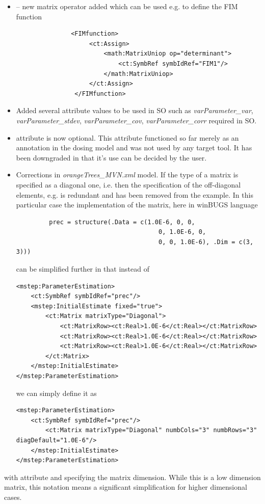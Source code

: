 \begin{itemize}
\item
{} -- new matrix operator added which can be used e.g. 
to define the FIM function
\lstset{language=XML}
\begin{lstlisting}
               <FIMfunction>
                    <ct:Assign>
                        <math:MatrixUniop op="determinant">
                            <ct:SymbRef symbIdRef="FIM1"/>
                        </math:MatrixUniop>
                    </ct:Assign>
                </FIMfunction>
\end{lstlisting}
\item
Added several  attribute values to be used in SO such as
\emph{varParameter\_var}, \emph{varParameter\_stdev}, \emph{varParameter\_cov}, 
\emph{varParameter\_corr} required in SO.
\item
{} attribute is now optional. This attribute functioned so far 
merely as an annotation in the dosing model and was not used by any target tool. 
It has been downgraded in that it's use can be decided by the user.
\item
Corrections in \emph{orangeTrees\_MVN.xml} model. If the type of a
matrix is specified as a diagonal one, i.e.  then the 
specification of the off-diagonal elements, e.g. 
is redundant and has been removed from the example. 
In this particular case the implementation of the matrix, here in winBUGS language
\lstset{language=MLX}
\begin{lstlisting}
         prec = structure(.Data = c(1.0E-6, 0, 0,
                                       0, 1.0E-6, 0,
                                       0, 0, 1.0E-6), .Dim = c(3, 3)))
\end{lstlisting}
can be simplified further in that instead of 
\lstset{language=XML}
\begin{lstlisting}
<mstep:ParameterEstimation>
    <ct:SymbRef symbIdRef="prec"/>
    <mstep:InitialEstimate fixed="true">
        <ct:Matrix matrixType="Diagonal">
            <ct:MatrixRow><ct:Real>1.0E-6</ct:Real></ct:MatrixRow>
            <ct:MatrixRow><ct:Real>1.0E-6</ct:Real></ct:MatrixRow>
            <ct:MatrixRow><ct:Real>1.0E-6</ct:Real></ct:MatrixRow>
        </ct:Matrix>
    </mstep:InitialEstimate>
</mstep:ParameterEstimation>
\end{lstlisting}
we can simply define it as
\lstset{language=XML}
\begin{lstlisting}
<mstep:ParameterEstimation>
    <ct:SymbRef symbIdRef="prec"/>
        <ct:Matrix matrixType="Diagonal" numbCols="3" numbRows="3" diagDefault="1.0E-6"/> 
    </mstep:InitialEstimate>
</mstep:ParameterEstimation>
\end{lstlisting}
\end{itemize}
with attribute  and  specifying the matrix dimension.
While this is a low dimension matrix, this notation means a significant simplification
for higher dimensional cases.













